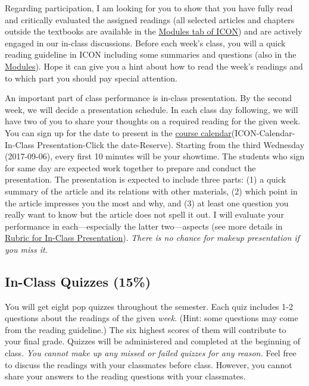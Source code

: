 \documentclass[11pt,]{article}
\theoremstyle{definition}
\theoremstyle{definition}
\theoremstyle{definition}
\theoremstyle{remark}
\begin{document}
Regarding participation, I am looking for you to show that you have
fully read and critically evaluated the assigned readings (all selected
articles and chapters outside the textbooks are available in the
\href{https://uiowa.instructure.com/courses/65855/modules}{Modules tab
of ICON}) and are actively engaged in our in-class discussions. Before
each week's class, you will a quick reading guideline in ICON including
some summaries and questions (also in the
\href{(https://uiowa.instructure.com/courses/65855/modules)}{Modules}).
Hope it can give you a hint about how to read the week's readings and to
which part you should pay special attention.

An important part of class performance is in-class presentation. By the
second week, we will decide a presentation schedule. In each class day
following, we will have two of you to share your thoughts on a required
reading for the given week. You can sign up for the date to present in
the
\href{https://uiowa.instructure.com/calendar\#view_name=scheduler\&view_start=2017-08-30\&appointment_group_id=195}{course
calendar}(ICON-Calendar-In-Class Presentation-Click the date-Reserve).
Starting from the third Wednesday (2017-09-06), every first 10 minutes
will be your showtime. The students who sign for same day are expected
work together to prepare and conduct the presentation. The presentation
is expected to include three parts: (1) a quick summary of the article
and its relations with other materials, (2) which point in the article
impresses you the most and why, and (3) at least one question you really
want to know but the article does not spell it out. I will evaluate your
performance in each---especially the latter two---aspects (see more
details in \protect\hyperlink{id}{Rubric for In-Class Presentation}).
\emph{There is no chance for makeup presentation if you miss it.}

\subsection{In-Class Quizzes (15\%)}\label{in-class-quizzes-15}

You will get eight pop quizzes throughout the semester. Each quiz
includes 1-2 questions about the readings of the given \emph{week}.
(Hint: some questions may come from the reading guideline.) The six
highest scores of them will contribute to your final grade. Quizzes will
be administered and completed at the beginning of class. \emph{You
cannot make up any missed or failed quizzes for any reason.} Feel free
to discuss the readings with your classmates before class. However, you
cannot share your answers to the reading questions with your classmates.
\end{document}
